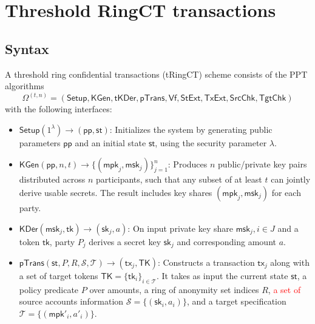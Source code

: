 
\section{Threshold RingCT transactions}

\subsection{Syntax}
\begin{definition}
A threshold ring confidential transactions (\textsf{tRingCT}) scheme consists of the PPT algorithms
\[
\Omega^{(t,n)} = (\textsf{Setup}, \textsf{KGen}, \textsf{tKDer}, \textsf{pTrans}, \textsf{Vf}, \textsf{StExt}, \textsf{TxExt}, \textsf{SrcChk}, \textsf{TgtChk})
\]
with the following interfaces:

\begin{itemize}
    \item $\mathsf{Setup}(1^\lambda) \rightarrow (\mathsf{pp}, \mathsf{st})$: Initializes the system by generating public parameters $\mathsf{pp}$ and an initial state $\mathsf{st}$, using the security parameter $\lambda$.

    \item $\mathsf{KGen}(\mathsf{pp}, n, t) \rightarrow \{(\mathsf{mpk}_j, \mathsf{msk}_j)\}_{j=1}^n$: Produces $n$ public/private key pairs distributed across $n$ participants, such that any subset of at least $t$ can jointly derive usable secrets. The result includes key shares $(\mathsf{mpk}_j, \mathsf{msk}_j)$ for each party.

    \item $\mathsf{KDer}(\mathsf{msk}_j, \mathsf{tk}) \rightarrow (\mathsf{sk}_j, a)$: On input private key share $\mathsf{msk}_j, {i \in J}$ and a token $\mathsf{tk}$, party $P_j$ derives a secret key $\mathsf{sk}_j$ and corresponding amount $a$.

    \item $\mathsf{pTrans}(\mathsf{st}, P, R, \mathcal{S}, \mathcal{T}) \rightarrow (\mathsf{tx}_j, \mathsf{TK})$: Constructs a transaction $\mathsf{tx}_j$ along with a set of target tokens $\mathsf{TK} = \{\mathsf{tk}_i\}_{i \in \mathcal{T}}$. It takes as input the current state $\mathsf{st}$, a policy predicate $P$ over amounts, a ring of anonymity set indices $R$, \textcolor{red}{a set of} source accounts information $\mathcal{S} = \{(\mathsf{sk}_i, a_i)\}$, and a target specification $\mathcal{T} = \{(\mathsf{mpk}'_i, a'_i)\}$.


\end{itemize}
\end{definition}
